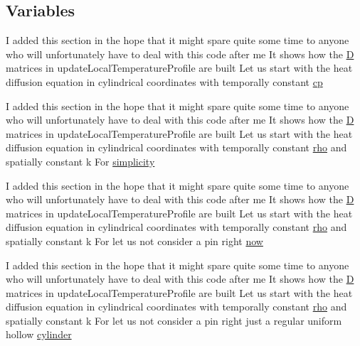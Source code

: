 \subsection*{Variables}
\begin{DoxyCompactItemize}
\item 
I added this section in the hope that it might spare quite some time to anyone who will unfortunately have to deal with this code after me It shows how the \hyperlink{setXSFieldsSN_8H_a70ac93a527a85b4edf386830643d1561}{D} matrices in update\+Local\+Temperature\+Profile are built Let us start with the heat diffusion equation in cylindrical coordinates with temporally constant \hyperlink{nuclearFuelPin_8C_ae5fc70d73cd9d6fbeb7bf5456b34ef16}{cp}
\item 
I added this section in the hope that it might spare quite some time to anyone who will unfortunately have to deal with this code after me It shows how the \hyperlink{setXSFieldsSN_8H_a70ac93a527a85b4edf386830643d1561}{D} matrices in update\+Local\+Temperature\+Profile are built Let us start with the heat diffusion equation in cylindrical coordinates with temporally constant \hyperlink{EEqn__1pl_8H_ac955f87ac2b79f02f420cae087fc52b1}{rho} and spatially constant k For \hyperlink{nuclearFuelPin_8C_ab5364626cf5774043302fd6c7196a05f}{simplicity}
\item 
I added this section in the hope that it might spare quite some time to anyone who will unfortunately have to deal with this code after me It shows how the \hyperlink{setXSFieldsSN_8H_a70ac93a527a85b4edf386830643d1561}{D} matrices in update\+Local\+Temperature\+Profile are built Let us start with the heat diffusion equation in cylindrical coordinates with temporally constant \hyperlink{EEqn__1pl_8H_ac955f87ac2b79f02f420cae087fc52b1}{rho} and spatially constant k For let us not consider a pin right \hyperlink{nuclearFuelPin_8C_a09404a3c5e8ea04b3e44ae4cb130f396}{now}
\item 
I added this section in the hope that it might spare quite some time to anyone who will unfortunately have to deal with this code after me It shows how the \hyperlink{setXSFieldsSN_8H_a70ac93a527a85b4edf386830643d1561}{D} matrices in update\+Local\+Temperature\+Profile are built Let us start with the heat diffusion equation in cylindrical coordinates with temporally constant \hyperlink{EEqn__1pl_8H_ac955f87ac2b79f02f420cae087fc52b1}{rho} and spatially constant k For let us not consider a pin right just a regular uniform hollow \hyperlink{nuclearFuelPin_8C_aa5e8becd7f504abaf6e34b6dcd491e94}{cylinder}
\end{DoxyCompactItemize}


